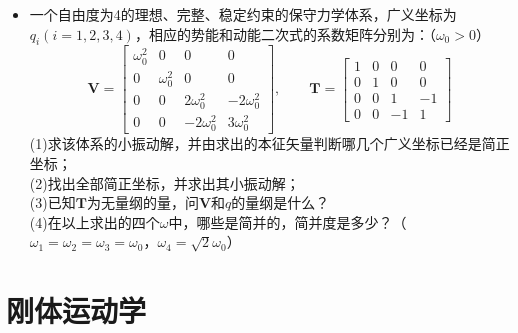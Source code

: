 \documentclass[a4paper,fontset=windows]{ctexart}
\begin{document}
\begin{itemize}
    \item[3.5]
    一个自由度为4的理想、完整、稳定约束的保守力学体系，广义坐标为$q_i(i=1,2,3,4)$，相应的势能和动能二次式的系数矩阵分别为：（$\omega_0>0$）
    \[
    \bm{V} =
        \begin{bmatrix}
            \omega_0^2 & 0 & 0 & 0 \\
            0 & \omega_0^2 & 0 & 0 \\
            0 & 0 & 2\omega_0^2 & -2\omega_0^2 \\
            0 & 0 & -2\omega_0^2 & 3\omega_0^2
        \end{bmatrix},\qquad
    \bm{T} =
        \begin{bmatrix}
            1 & 0 & 0 & 0 \\
            0 & 1 & 0 & 0 \\
            0 & 0 & 1 & -1 \\
            0 & 0 & -1 & 1
        \end{bmatrix}
    \]
    (1)求该体系的小振动解，并由求出的本征矢量判断哪几个广义坐标已经是简正坐标； \\
    (2)找出全部简正坐标，并求出其小振动解； \\
    (3)已知$\bm{T}$为无量纲的量，问$\bm{V}$和$q$的量纲是什么？ \\
    (4)在以上求出的四个$\omega$中，哪些是简并的，简并度是多少？（$\omega_1=\omega_2=\omega_3=\omega_0$，$\omega_4=\sqrt{2}\omega_0$）

    \end{itemize}

    \section*{刚体运动学}
\end{document}
